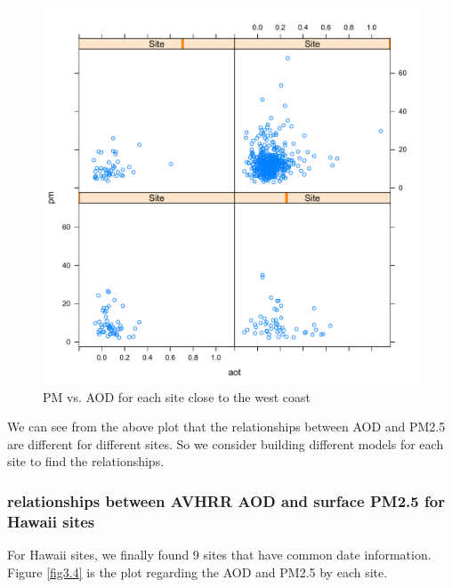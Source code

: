 \documentclass[10pt]{article}
\begin{document}
\begin{figure}[!h]
\centering
\includegraphics[width=\linewidth]{3.pdf}
\caption{PM vs. AOD for each site close to the west coast}
\label{fig3.3}
\end{figure}

We can see from the above plot that the relationships between AOD and PM2.5 are different for different sites. So we consider building different models for each site to find the relationships.

\subsubsection{relationships between AVHRR AOD and surface PM2.5 for Hawaii sites}

For Hawaii sites, we finally found 9 sites that have common date information. Figure \ref{fig3.4} is the plot regarding the AOD and PM2.5 by each site. 
\end{document}
